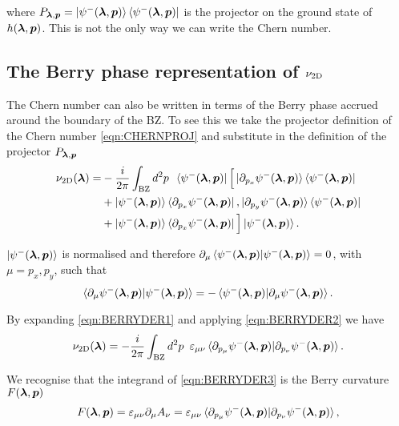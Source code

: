 \noi where $P_{\boldsymbol{\lambda},\boldsymbol{p}}=\ket{\psi^{-}(\boldsymbol{\lambda},\boldsymbol{p})}\bra{\psi^{-}(\boldsymbol{\lambda},\boldsymbol{p})}$ is the projector on the ground state of $h(\boldsymbol{\lambda},\boldsymbol{p})$. This is not the only way we can write the Chern number.

\subsection{The Berry phase representation of $\nu_{\text{2D}}$}

The Chern number can also be written in terms of the Berry phase accrued around the boundary of the BZ. To see this we take the projector definition of the Chern number \eqref{eqn:CHERNPROJ} and substitute in the definition of the projector $P_{\boldsymbol{\lambda},\boldsymbol{p}}$
\begin{align}\label{eqn:BERRYDER1}
    \nu_{\text{2D}}(\boldsymbol{\lambda})=&-\frac{i}{2\pi}\int_{\text{BZ}} d^{2}p \,\,\, \bra{\psi^{-}(\boldsymbol{\lambda},\boldsymbol{p})} \Big[ \ket{\partial_{p_{x}}\psi^{-}(\boldsymbol{\lambda},\boldsymbol{p})}\bra{\psi^{-}(\boldsymbol{\lambda},\boldsymbol{p})} \nonumber\\
                  &+ \ket{\psi^{-}(\boldsymbol{\lambda},\boldsymbol{p})}\bra{\partial_{p_{x}}\psi^{-}(\boldsymbol{\lambda},\boldsymbol{p})},\ket{\partial_{p_{y}}\psi^{-}(\boldsymbol{\lambda},\boldsymbol{p})}\bra{\psi^{-}(\boldsymbol{\lambda},\boldsymbol{p})} \nonumber\\
                  &+\ket{\psi^{-}(\boldsymbol{\lambda},\boldsymbol{p})}\bra{\partial_{p_{x}}\psi^{-}(\boldsymbol{\lambda},\boldsymbol{p})}\Big] \ket{\psi^{-}(\boldsymbol{\lambda},\boldsymbol{p})}.
\end{align}

\noi $\ket{\psi^{-}(\boldsymbol{\lambda},\boldsymbol{p})}$ is normalised and therefore $\partial_{\mu}\braket{\psi^{-}(\boldsymbol{\lambda},\boldsymbol{p})|\psi^{-}(\boldsymbol{\lambda},\boldsymbol{p})}=0$, with $\mu=p_{x},p_{y}$, such that
\begin{equation}\label{eqn:BERRYDER2}
    \braket{\partial_{\mu}\psi^{-}(\boldsymbol{\lambda},\boldsymbol{p})|\psi^{-}(\boldsymbol{\lambda},\boldsymbol{p})} = -\braket{\psi^{-}(\boldsymbol{\lambda},\boldsymbol{p})|\partial_{\mu}\psi^{-}(\boldsymbol{\lambda},\boldsymbol{p})}.
\end{equation}

\noi By expanding \eqref{eqn:BERRYDER1} and applying \eqref{eqn:BERRYDER2} we have
\begin{equation}\label{eqn:BERRYDER3}
    \nu_{\text{2D}}(\boldsymbol{\lambda})=-\frac{i}{2\pi}\int_{\text{BZ}} d^{2}p \,\,\, \varepsilon_{\mu\nu}\braket{\partial_{p_{\mu}}\psi^{-}(\boldsymbol{\lambda},\boldsymbol{p})|\partial_{p_{\nu}}\psi^{-}(\boldsymbol{\lambda},\boldsymbol{p})}.
\end{equation}

\noi We recognise that the integrand of \eqref{eqn:BERRYDER3} is the Berry curvature $F(\boldsymbol{\lambda},\boldsymbol{p})$
\begin{equation}
    F(\boldsymbol{\lambda},\boldsymbol{p})=\varepsilon_{\mu\nu}\partial_{\mu}A_{\nu}=\varepsilon_{\mu\nu}\braket{\partial_{p_{\mu}}\psi^{-}(\boldsymbol{\lambda},\boldsymbol{p})|\partial_{p_{\nu}}\psi^{-}(\boldsymbol{\lambda},\boldsymbol{p})},
\end{equation}

